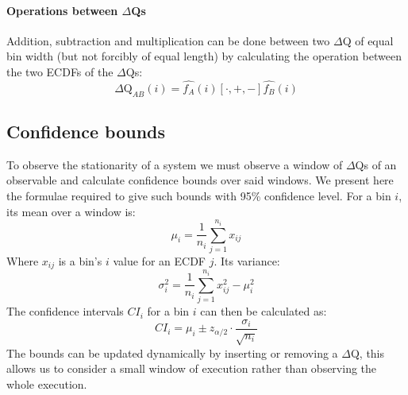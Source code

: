     \paragraph{Operations between $\Delta$Qs} 
        Addition, subtraction and multiplication can be done between two $\Delta$Q of equal bin width (but not forcibly of equal length) by calculating the operation between the two ECDFs of the $\Delta$Qs:
        \begin{equation}
            \Delta \text{Q}_{AB}(i) = \hat{f_A}(i) [\cdot, +, -] \hat{f_B}(i)
            \label{eq:op_dq}
        \end{equation}
    \subsection{Confidence bounds}
    To observe the stationarity of a system we must observe a window of $\Delta$Qs of an observable and calculate confidence bounds over said windows. We present here the formulae required to give such bounds with 95\% confidence level. 
        For a bin $i$, its mean over a window is:
            \begin{equation}
                \mu_i = \dfrac{1}{n_i} \sum_{j=1}^{n_i} x_{ij}
                \label{eq:mean_ecdf}
            \end{equation}
        Where $x_{ij}$ is a bin's $i$ value for an ECDF $j$.
        Its variance:
            \begin{equation}
                \sigma^2_i = \dfrac{1}{n_i} \sum_{j=1}^{n_i} x^2_{ij} - \mu^2_i
                \label{eq:var_ecdf}
            \end{equation}
        The confidence intervals $CI_i$ for a bin $i$ can then be calculated as:
        \begin{equation}
            CI_i = \mu_i \pm z_{\alpha/2} \cdot \dfrac{\sigma_i}{\sqrt{n_i}}      
            \label{eq:ci_i}
        \end{equation}
    The bounds can be updated dynamically by inserting or removing a $\Delta$Q, this allows us to consider a small window of execution rather than observing the whole execution.
